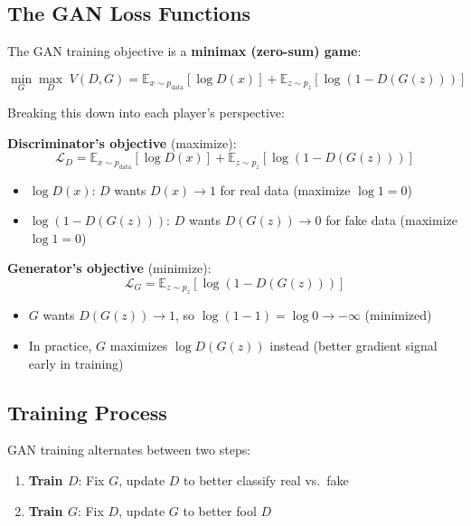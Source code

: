 \documentclass[11pt,a4paper]{article}
\begin{document}
\subsection{The GAN Loss Functions}

The GAN training objective is a \textbf{minimax (zero-sum) game}:

\begin{equation}
\boxed{\min_G \max_D\; V(D, G) = \mathbb{E}_{x \sim p_{\text{data}}}[\log D(x)] + \mathbb{E}_{z \sim p_z}[\log(1 - D(G(z)))]}
\end{equation}

Breaking this down into each player's perspective:

\medskip
\noindent\textbf{Discriminator's objective} (maximize):
\begin{equation}
\mathcal{L}_D = \mathbb{E}_{x \sim p_{\text{data}}}[\log D(x)] + \mathbb{E}_{z \sim p_z}[\log(1 - D(G(z)))]
\end{equation}
\begin{itemize}[leftmargin=1.5em]
    \item $\log D(x)$: $D$ wants $D(x) \to 1$ for real data (maximize $\log 1 = 0$)
    \item $\log(1 - D(G(z)))$: $D$ wants $D(G(z)) \to 0$ for fake data (maximize $\log 1 = 0$)
\end{itemize}

\noindent\textbf{Generator's objective} (minimize):
\begin{equation}
\mathcal{L}_G = \mathbb{E}_{z \sim p_z}[\log(1 - D(G(z)))]
\end{equation}
\begin{itemize}[leftmargin=1.5em]
    \item $G$ wants $D(G(z)) \to 1$, so $\log(1 - 1) = \log 0 \to -\infty$ (minimized)
    \item In practice, $G$ maximizes $\log D(G(z))$ instead (better gradient signal early in training)
\end{itemize}

\subsection{Training Process}

GAN training alternates between two steps:
\begin{enumerate}[leftmargin=1.5em]
    \item \textbf{Train $D$}: Fix $G$, update $D$ to better classify real vs.\ fake
    \item \textbf{Train $G$}: Fix $D$, update $G$ to better fool $D$
\end{enumerate}
\end{document}
